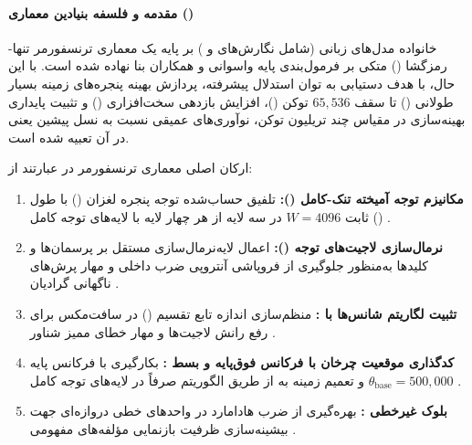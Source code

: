 \item {}

\paragraph*{مقدمه و فلسفه بنیادین معماری ()}
خانواده مدل‌های زبانی  (شامل نگارش‌های  و ) بر پایه یک معماری ترنسفورمر تنها-رمزگشا () متکی بر فرمول‌بندی پایه واسوانی و همکاران \cite{vaswani2017attention} بنا نهاده شده است. با این حال، با هدف دستیابی به توان استدلال پیشرفته، پردازش بهینه پنجره‌های زمینه بسیار طولانی () تا سقف $65{,}536$ توکن ()، افزایش بازدهی سخت‌افزاری () و تثبیت پایداری بهینه‌سازی در مقیاس چند تریلیون توکن، نوآوری‌های عمیقی نسبت به نسل پیشین یعنی  \cite{olmo2024furious} در آن تعبیه شده است.

ارکان اصلی معماری ترنسفورمر در  عبارتند از:
\begin{enumerate}
    \item \textbf{مکانیزم توجه آمیخته تنک-کامل ():} تلفیق حساب‌شده توجه پنجره لغزان () با طول ثابت $W=4096$ در سه لایه از هر چهار لایه با لایه‌های توجه کامل () \cite{beltagy2020longformer}.
    \item \textbf{نرمال‌سازی لاجیت‌های توجه ():} اعمال لایه‌نرمال‌سازی مستقل بر پرسمان‌ها و کلیدها به‌منظور جلوگیری از فروپاشی آنتروپی ضرب داخلی و مهار پرش‌های ناگهانی گرادیان \cite{dehghani2023scaling}.
    \item \textbf{تثبیت لگاریتم شانس‌ها با :} منظم‌سازی اندازه تابع تقسیم () در سافت‌مکس برای رفع رانش لاجیت‌ها و مهار خطای ممیز شناور .
    \item \textbf{کدگذاری موقعیت چرخان با فرکانس فوق‌پایه و بسط :} بکارگیری  با فرکانس پایه $\theta_{\text{base}} = 500{,}000$ و تعمیم زمینه به  از طریق الگوریتم  صرفاً در لایه‌های توجه کامل \cite{peng2023yarn, su2024roformer}.
    \item \textbf{بلوک غیرخطی :} بهره‌گیری از ضرب هادامارد در واحدهای خطی دروازه‌ای جهت بیشینه‌سازی ظرفیت بازنمایی مؤلفه‌های مفهومی \cite{shazeer2020glu}.
\end{enumerate}

